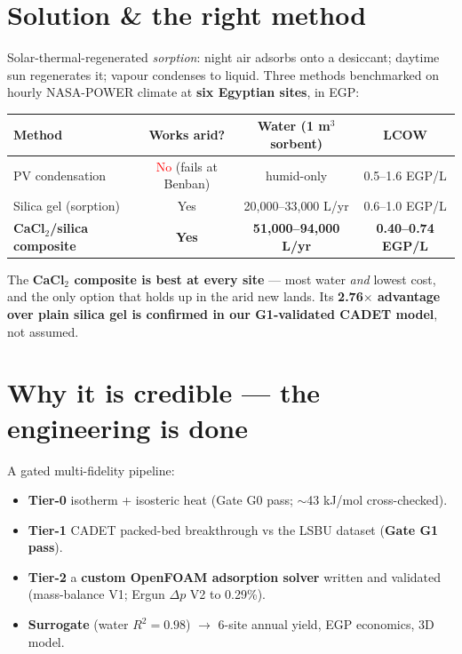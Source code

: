 \documentclass[10pt,a4paper]{article}
\newcommand{\hl}[1]{\textbf{\color{zc}#1}}
\begin{document}
\section{Solution \& the right method}
Solar-thermal-regenerated \emph{sorption}: night air adsorbs onto a desiccant; daytime sun
regenerates it; vapour condenses to liquid. Three methods benchmarked on hourly NASA-POWER
climate at \hl{six Egyptian sites}, in EGP:

\begin{center}
\begin{tabular}{@{}lccc@{}}
\toprule
\textbf{Method} & \textbf{Works arid?} & \textbf{Water (1 m$^3$ sorbent)} & \textbf{LCOW} \\
\midrule
PV condensation & \textcolor{red}{No} (fails at Benban) & humid-only & 0.5--1.6 EGP/L \\
Silica gel (sorption) & Yes & 20{,}000--33{,}000 L/yr & 0.6--1.0 EGP/L \\
\rowcolor{zclight}\textbf{CaCl$_2$/silica composite} & \textbf{Yes} & \textbf{51{,}000--94{,}000 L/yr} & \textbf{0.40--0.74 EGP/L} \\
\bottomrule
\end{tabular}
\end{center}

The \hl{CaCl$_2$ composite is best at every site} --- most water \emph{and} lowest cost, and the
only option that holds up in the arid new lands. Its \hl{2.76$\times$ advantage over plain silica
gel is confirmed in our G1-validated CADET model}, not assumed.

\section{Why it is credible --- the engineering is done}
A gated multi-fidelity pipeline:
\begin{itemize}
  \item \textbf{Tier-0} isotherm + isosteric heat (Gate G0 pass; $\sim$43 kJ/mol cross-checked).
  \item \textbf{Tier-1} CADET packed-bed breakthrough vs the LSBU dataset (\textbf{Gate G1 pass}).
  \item \textbf{Tier-2} a \textbf{custom OpenFOAM adsorption solver} written and validated
        (mass-balance V1; Ergun $\Delta p$ V2 to 0.29\%).
  \item \textbf{Surrogate} (water $R^2{=}0.98$) $\rightarrow$ 6-site annual yield, EGP economics, 3D model.
\end{itemize}
\end{document}
